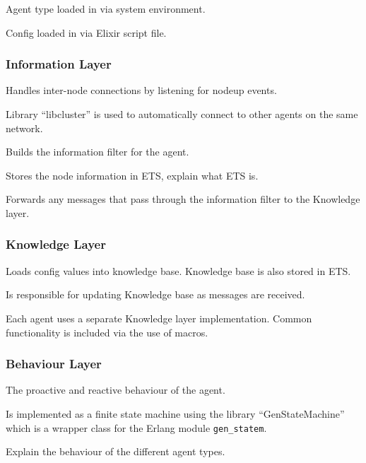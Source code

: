 Agent type loaded in via system environment.

Config loaded in via Elixir script file.

\subsubsection{Information Layer}

Handles inter-node connections by listening for nodeup events.

Library ``libcluster'' is used to automatically connect to other agents on the same network.

Builds the information filter for the agent.

Stores the node information in ETS, explain what ETS is.

Forwards any messages that pass through the information filter to the Knowledge layer.

\subsubsection{Knowledge Layer}

Loads config values into knowledge base.
Knowledge base is also stored in ETS\@.

Is responsible for updating Knowledge base as messages are received.

Each agent uses a separate Knowledge layer implementation.
Common functionality is included via the use of macros.

\subsubsection{Behaviour Layer}

The proactive and reactive behaviour of the agent.

Is implemented as a finite state machine using the library ``GenStateMachine'' which is a wrapper class for the Erlang module \verb|gen_statem|.

Explain the behaviour of the different agent types.
